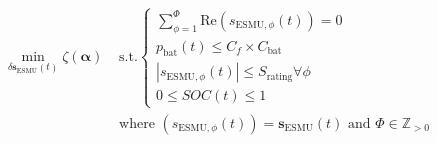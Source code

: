 \begin{equation}
\begin{split}
	\min_{\delta \textbf{s}_\text{ESMU}(t)} \zeta(\boldsymbol{\alpha})
	&\text{ s.t.}
	\begin{cases}
		\sum_{\phi=1}^{\Phi} \text{Re} \left(s_{\text{ESMU},\phi}(t)\right) = 0 \\
		p_\text{bat}(t) \leq C_f\times C_\text{bat} \\
		\left|s_{\text{ESMU},\phi}(t)\right| \leq S_\text{rating} \forall \phi \\
		0 \leq SOC(t) \leq 1 
	\end{cases}\\
	&\text{ where } (s_{\text{ESMU},\phi}(t)) = \textbf{s}_\text{ESMU}(t) \text{ and } \Phi \in \mathbb{Z}_{>0}
\end{split}
\label{ch1:equ:closed-loop-minimisation}
\end{equation}
